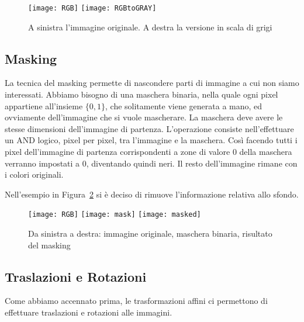 \begin{figure}[ht]
  \begin{center}
    \texttt{[image: RGB]}
    \texttt{[image: RGBtoGRAY]}
    \caption{A sinistra l'immagine originale. A destra la versione in scala di grigi}
    \label{fig:rgb2gray_example}
  \end{center}
\end{figure}


\clearpage
\subsection {Masking}
La tecnica del masking permette di nascondere parti di immagine a cui non siamo interessati.
Abbiamo bisogno di una maschera binaria, nella quale ogni pixel appartiene all'insieme $\{0,1\}$, che solitamente viene generata a mano, ed ovviamente dell'immagine che si vuole mascherare.
La maschera deve avere le stesse dimensioni dell'immagine di partenza.
L'operazione consiste nell'effettuare un AND logico, pixel per pixel,  tra l'immagine e la maschera.
Così facendo tutti i pixel dell'immagine di partenza corrispondenti a zone di valore $0$ della maschera verranno impostati a $0$, diventando quindi neri.
Il resto dell'immagine rimane con i colori originali.

Nell'esempio in Figura~\ref{fig:mask_example} si è deciso di rimuove l'informazione relativa allo sfondo.
\begin{figure}[ht] %
  \begin{center}
    \texttt{[image: RGB]}
    \texttt{[image: mask]}
    \texttt{[image: masked]}
    \caption{Da sinistra a destra: immagine originale, maschera binaria, risultato del masking}
    \label{fig:mask_example}
  \end{center}
\end{figure}


\clearpage
\subsection {Traslazioni e Rotazioni}
Come abbiamo accennato prima, le trasformazioni affini ci permettono di effettuare traslazioni e rotazioni alle immagini.

